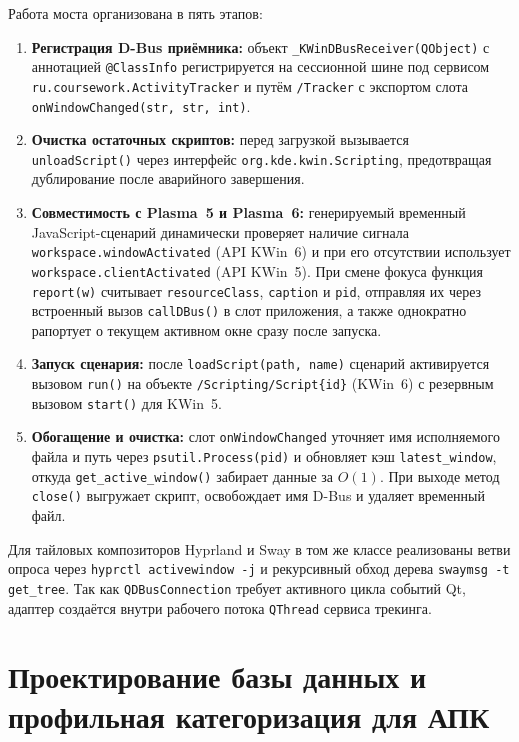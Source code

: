 \documentclass{timcw}
\begin{document}
Работа моста организована в пять этапов:
\begin{enumerate}
  \item \textbf{Регистрация D-Bus приёмника:} объект \texttt{\_KWinDBusReceiver(QObject)} с аннотацией \texttt{@ClassInfo} регистрируется на сессионной шине под сервисом \texttt{ru.coursework.ActivityTracker} и путём \texttt{/Tracker} с экспортом слота \texttt{onWindowChanged(str, str, int)}.
  \item \textbf{Очистка остаточных скриптов:} перед загрузкой вызывается \texttt{unloadScript()} через интерфейс \texttt{org.kde.kwin.Scripting}, предотвращая дублирование после аварийного завершения.
  \item \textbf{Совместимость с Plasma~5 и Plasma~6:} генерируемый временный JavaScript-сценарий динамически проверяет наличие сигнала \texttt{workspace.windowActivated} (API KWin~6) и при его отсутствии использует \texttt{workspace.clientActivated} (API KWin~5). При смене фокуса функция \texttt{report(w)} считывает \texttt{resourceClass}, \texttt{caption} и \texttt{pid}, отправляя их через встроенный вызов \texttt{callDBus()} в слот приложения, а также однократно рапортует о текущем активном окне сразу после запуска.
  \item \textbf{Запуск сценария:} после \texttt{loadScript(path, name)} сценарий активируется вызовом \texttt{run()} на объекте \texttt{/Scripting/Script\{id\}} (KWin~6) с резервным вызовом \texttt{start()} для KWin~5.
  \item \textbf{Обогащение и очистка:} слот \texttt{onWindowChanged} уточняет имя исполняемого файла и путь через \texttt{psutil.Process(pid)} и обновляет кэш \texttt{latest\_window}, откуда \texttt{get\_active\_window()} забирает данные за $O(1)$. При выходе метод \texttt{close()} выгружает скрипт, освобождает имя D-Bus и удаляет временный файл.
\end{enumerate}

Для тайловых композиторов Hyprland и Sway в том же классе реализованы ветви опроса через \texttt{hyprctl activewindow -j} и рекурсивный обход дерева \texttt{swaymsg -t get\_tree}. Так как \texttt{QDBusConnection} требует активного цикла событий Qt, адаптер создаётся внутри рабочего потока \texttt{QThread} сервиса трекинга.

\section{Проектирование базы данных и профильная категоризация для АПК}
\end{document}
